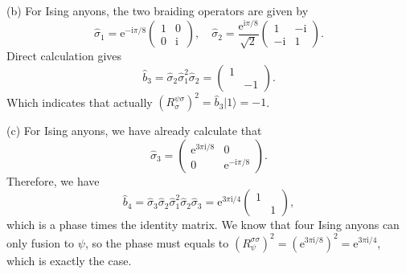 (b) For Ising anyons, the two braiding operators are given by
\begin{equation*}
\hat{\sigma }_{1} =\mathrm{e}^{-\mathrm{i} \pi /8}\begin{pmatrix}
1 & 0\\
0 & \mathrm{i}
\end{pmatrix} ,\quad \hat{\sigma }_{2} =\frac{\mathrm{e}^{\mathrm{i} \pi /8}}{\sqrt{2}}\begin{pmatrix}
1 & -\mathrm{i}\\
-\mathrm{i} & 1
\end{pmatrix} .
\end{equation*}
Direct calculation gives
\begin{equation*}
\hat{b}_{3} =\hat{\sigma }_{2}\hat{\sigma }_{1}^{2}\hat{\sigma }_{2} =\begin{pmatrix}
1 & \\
 & -1
\end{pmatrix} .
\end{equation*}
Which indicates that actually $(R_{\sigma }^{\psi \sigma } )^{2} =\hat{b}_{3} |1 \rangle =-1$. 



(c) For Ising anyons, we have already calculate that
\begin{equation*}
\hat{\sigma }_{3} =\begin{pmatrix}
\mathrm{e}^{3\pi \mathrm{i} /8} & 0\\
0 & \mathrm{e}^{-\mathrm{i} \pi /8}
\end{pmatrix} .
\end{equation*}
Therefore, we have
\begin{equation*}
\hat{b}_{4} =\hat{\sigma }_{3}\hat{\sigma }_{2}\hat{\sigma }_{1}^{2}\hat{\sigma }_{2}\hat{\sigma }_{3} =\mathrm{e}^{3\pi \mathrm{i} /4}\begin{pmatrix}
1 & \\
 & 1
\end{pmatrix} ,
\end{equation*}
which is a phase times the identity matrix. We know that four Ising anyons can only fusion to $\psi $, so the phase must equals to $(R_{\psi }^{\sigma \sigma } )^{2} =(\mathrm{e}^{3\pi \mathrm{i} /8} )^{2} =\mathrm{e}^{3\pi \mathrm{i} /4}$, which is exactly the case. 



